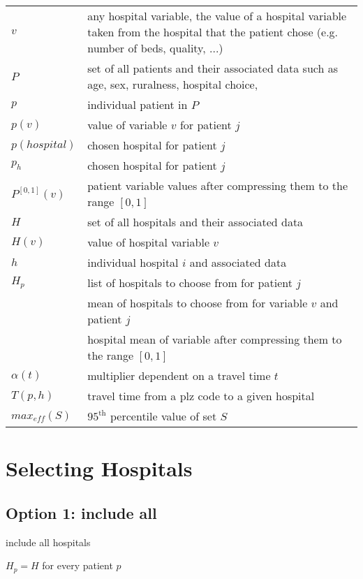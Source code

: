\documentclass{amsart}
\newcommand*\mean[1]{\mathop{\overline{#1}}}
\begin{document}
\begin{table}[h]
	\begin{tabular}{ll}
		$v$ & any hospital variable, the value of a hospital variable taken from the hospital that the patient chose (e.g. number of beds, quality, ...)\\
		$P$ & set of all patients and their associated data such as age, sex, ruralness, hospital choice, \\
		$p$ & individual patient in $P$\\
		$p(v)$ & value of variable $v$ for patient $j$\\
		$p(hospital)$ & chosen hospital for patient $j$\\
		$p_h$ & chosen hospital for patient $j$\\
		$P^{\left[0,1\right]}(v)$ & patient variable values after compressing them to the range $[0,1]$\\
		$H$ & set of all hospitals and their associated data\\
		$H(v)$ & value of hospital variable $v$\\
		$h$ & individual hospital $i$ and associated data\\
		$H_p$ & list of hospitals to choose from for patient $j$\\
		$\mean{H_p(v)}$ & mean of hospitals to choose from for variable $v$ and patient $j$\\
		$\mean{H^{\left[0,1\right]}_p(v)}$&hospital mean of variable after compressing them to the range $[0,1]$\\
		$\alpha(t)$ & multiplier dependent on a travel time $t$\\
		$T(p, h)$ & travel time from a plz code to a given hospital\\
		$max_{eff}(S)$ & $95^{\text{th}}$ percentile value of set $S$\\
	\end{tabular}
\end{table}




\section{Selecting Hospitals}

\subsection{Option 1: include all}
include all hospitals

$H_p = H$ for every patient $p$
\end{document}
